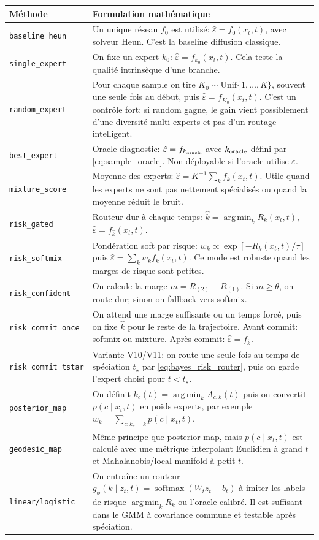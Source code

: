 \documentclass[11pt,a4paper]{article}
\newcommand{\softmax}{\operatorname{softmax}}
\newcommand{\argmin}{\operatorname*{arg\,min}}
\newcommand{\1}{\mathbf{1}}
\newcommand{\eps}{\varepsilon}
\newcommand{\xt}{x_t}
\begin{document}
\begin{longtable}{>{\raggedright\arraybackslash}p{3.2cm} p{11.2cm}}
\toprule
Méthode & Formulation mathématique \\
\midrule
\endhead
\texttt{baseline\_heun} & Un unique réseau $f_0$ est utilisé: $\hat\eps=f_0(\xt,t)$, avec solveur Heun. C'est la baseline diffusion classique. \\
\addlinespace
\texttt{single\_expert} & On fixe un expert $k_0$: $\hat\eps=f_{k_0}(\xt,t)$. Cela teste la qualité intrinsèque d'une branche. \\
\addlinespace
\texttt{random\_expert} & Pour chaque sample on tire $K_0\sim\mathrm{Unif}\{1,\dots,K\}$, souvent une seule fois au début, puis $\hat\eps=f_{K_0}(\xt,t)$. C'est un contrôle fort: si random gagne, le gain vient possiblement d'une diversité multi-experts et pas d'un routage intelligent. \\
\addlinespace
\texttt{best\_expert} & Oracle diagnostic: $\hat\eps=f_{k_{\rm oracle}}$ avec $k_{\rm oracle}$ défini par \eqref{eq:sample_oracle}. Non déployable si l'oracle utilise $\eps$. \\
\addlinespace
\texttt{mixture\_score} & Moyenne des experts: $\hat\eps=K^{-1}\sum_k f_k(\xt,t)$. Utile quand les experts ne sont pas nettement spécialisés ou quand la moyenne réduit le bruit. \\
\addlinespace
\texttt{risk\_gated} & Routeur dur à chaque temps: $\hat k=\argmin_k R_k(\xt,t)$, $\hat\eps=f_{\hat k}(\xt,t)$. \\
\addlinespace
\texttt{risk\_softmix} & Pondération soft par risque: $w_k\propto\exp[-R_k(\xt,t)/\tau]$ puis $\hat\eps=\sum_k w_kf_k(\xt,t)$. Ce mode est robuste quand les marges de risque sont petites. \\
\addlinespace
\texttt{risk\_confident} & On calcule la marge $m=R_{(2)}-R_{(1)}$. Si $m\ge\theta$, on route dur; sinon on fallback vers softmix. \\
\addlinespace
\texttt{risk\_commit\_once} & On attend une marge suffisante ou un temps forcé, puis on fixe $\hat k$ pour le reste de la trajectoire. Avant commit: softmix ou mixture. Après commit: $\hat\eps=f_{\hat k}$. \\
\addlinespace
\texttt{risk\_commit\_tstar} & Variante V10/V11: on route une seule fois au temps de spéciation $t_\star$ par \eqref{eq:bayes_risk_router}, puis on garde l'expert choisi pour $t<t_\star$. \\
\addlinespace
\texttt{posterior\_map} & On définit $k_c(t)=\argmin_k A_{c,k}(t)$ puis on convertit $p(c\mid\xt,t)$ en poids experts, par exemple $w_k=\sum_{c:k_c=k}p(c\mid\xt,t)$. \\
\addlinespace
\texttt{geodesic\_map} & Même principe que posterior-map, mais $p(c\mid\xt,t)$ est calculé avec une métrique interpolant Euclidien à grand $t$ et Mahalanobis/local-manifold à petit $t$. \\
\addlinespace
\texttt{linear/logistic} & On entraîne un routeur $g_\phi(k\mid z_t,t)=\softmax(W_tz_t+b_t)$ à imiter les labels de risque $\argmin_k R_k$ ou l'oracle calibré. Il est suffisant dans le GMM à covariance commune et testable après spéciation. \\
\bottomrule
\end{longtable}
\end{document}
